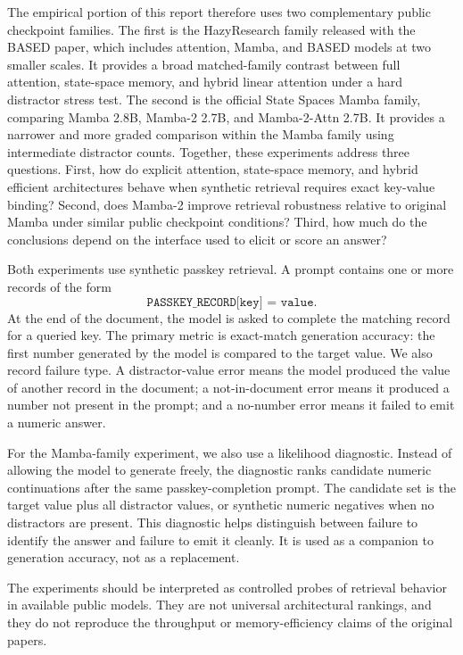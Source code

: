 \documentclass[10pt]{article}
\begin{document}
The empirical portion of this report therefore uses two complementary public
checkpoint families. The first is the HazyResearch family released with the
BASED paper, which includes attention, Mamba, and BASED models at two smaller scales. It provides a broad matched-family contrast between full attention, state-space memory, and hybrid linear attention under a hard distractor stress test. The second is the official State Spaces Mamba family, comparing Mamba
2.8B, Mamba-2 2.7B, and Mamba-2-Attn 2.7B. It provides a narrower and more
graded comparison within the Mamba family using intermediate distractor
counts. Together, these experiments address three questions. First, how do
explicit attention, state-space memory, and hybrid efficient architectures
behave when synthetic retrieval requires exact key-value binding? Second, does
Mamba-2 improve retrieval robustness relative to original Mamba under similar
public checkpoint conditions? Third, how much do the conclusions depend on the
interface used to elicit or score an answer?

Both experiments use synthetic passkey retrieval. A prompt contains one or more
records of the form
\[
\texttt{PASSKEY\_RECORD[key] = value}.
\]
At the end of the document, the model is asked to complete the matching record
for a queried key. The primary metric is exact-match generation accuracy: the
first number generated by the model is compared to the target value. We also
record failure type. A distractor-value error means the model produced the
value of another record in the document; a not-in-document error means it
produced a number not present in the prompt; and a no-number error means it
failed to emit a numeric answer.

For the Mamba-family experiment, we also use a likelihood diagnostic. Instead
of allowing the model to generate freely, the diagnostic ranks candidate
numeric continuations after the same passkey-completion prompt. The candidate
set is the target value plus all distractor values, or synthetic numeric
negatives when no distractors are present. This diagnostic helps distinguish
between failure to identify the answer and failure to emit it cleanly. It is
used as a companion to generation accuracy, not as a replacement.

The experiments should be interpreted as controlled probes of retrieval
behavior in available public models. They are not universal architectural
rankings, and they do not reproduce the throughput or memory-efficiency claims
of the original papers.
\end{document}
